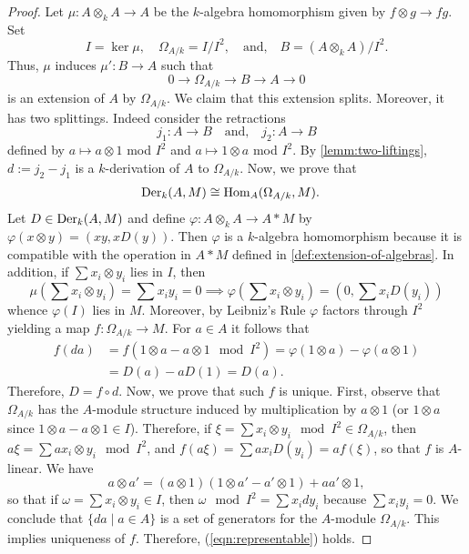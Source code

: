 \begin{proof}
	Let $\mu\colon A \otimes_{k} A \to A$ be the $k$-algebra homomorphism given by $f \otimes g \to fg$. Set
	\[
		I = \ker \mu, \quad \Omega_{A/k} = I/I^{2}, \quad \text{and,} \quad B = (A \otimes_{k} A)/I^{2}.
	\]
	Thus, $\mu$ induces $\mu'\colon B \to A$ such that
	\[
		0 \to \Omega_{A/k} \to B \to A \to 0
	\]
	is an extension of $A$ by $\Omega_{A/k}$. We claim that this extension splits. Moreover, it has two splittings. Indeed consider the retractions
	\[
		j_{1}\colon A \to B \quad\text{and,}\quad j_{2}\colon A \to B
	\]
	defined by $a \mapsto a\otimes 1$ mod $I^{2}$ and $a \mapsto 1 \otimes a$ mod $I^{2}$. By \cref{lemm:two-liftings}, $d := j_{2} - j_{1}$ is a $k$-derivation of $A$ to $\Omega_{A/k}$. Now, we prove that 
	\begin{align}\label{eqn:representable}
		\operatorname{Der}_{k}(A,M) &\cong \operatorname{Hom}_{A}(\Omega_{A/k}, M).
	\end{align}	
	Let $D \in \operatorname{Der}_{k}(A,M)$ and define $\varphi\colon A \otimes_{k} A \to A * M$ by $\varphi(x \otimes y) = (xy, xD(y))$. Then $\varphi$ is a $k$-algebra homomorphism because it is compatible with the operation in $A * M$ defined in \cref{def:extension-of-algebras}. In addition, if $\sum x_{i} \otimes y_{i}$ lies in $I$, then
	\[
		\mu\left(\sum x_{i} \otimes y_{i}\right) = \sum x_{i}y_{i} = 0 \implies \varphi\left(\sum x_{i} \otimes y_{i}\right) = (0, \sum x_{i}D(y_{i}))
	\]
	whence $\varphi(I)$ lies in $M$. Moreover, by Leibniz's Rule $\varphi$ factors through $I^{2}$ yielding a map $f\colon \Omega_{A/k}\to M$. For $a \in A$ it follows that 
	\begin{align*}
		f(da) &= f(1 \otimes a - a \otimes 1 \mod I^{2}) = \varphi(1 \otimes a) - \varphi(a \otimes 1) \\
		&= D(a) - aD(1) = D(a). 
	\end{align*} 	
	Therefore, $D = f\circ d$. Now, we prove that such $f$ is unique. First, observe that $\Omega_{A/k}$ has the $A$-module structure induced by multiplication by $a \otimes 1$ (or $1 \otimes a$ since $1 \otimes a - a \otimes 1 \in I$). Therefore, if $\xi = \sum x_{i} \otimes y_{i} \mod I^{2} \in \Omega_{A/k}$, then $a\xi = \sum ax_{i}\otimes y_{i} \mod I^{2}$, and $f(a\xi) = \sum ax_{i}D(y_{i}) = af(\xi)$, so that $f$ is $A$-linear. We have
	\[
		a \otimes a' = (a \otimes 1)(1 \otimes a' - a' \otimes 1) +  aa' \otimes 1,
	\]
	so that if $\omega = \sum x_{i}\otimes y_{i} \in I$, then $\omega \mod I^{2} = \sum x_{i} dy_{i}$ because $\sum x_{i}y_{i} = 0$. We conclude that $\{da\mid a\in A\}$ is a set of generators for the $A$-module $\Omega_{A/k}$. This implies uniqueness of $f$. Therefore, (\ref{eqn:representable}) holds.
\end{proof}

